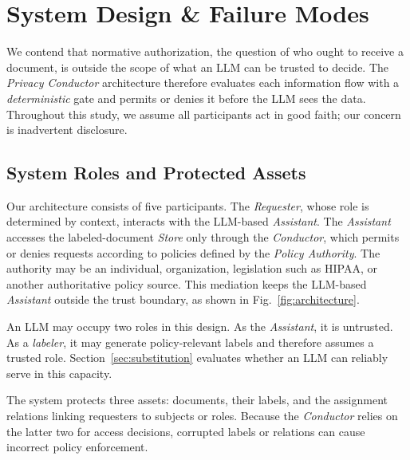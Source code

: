 \section{System Design \& Failure Modes}
\label{sec:design}

We contend that normative authorization, the question of who ought to receive
a document, is outside the scope of what an LLM can be trusted to decide. The \textit{Privacy Conductor} architecture therefore evaluates each information flow with a \textit{deterministic} gate and permits or denies it before the LLM sees the data. Throughout this study, we assume all participants act in good faith; our concern is inadvertent disclosure.

\subsection{System Roles and Protected Assets}
Our architecture consists of five participants. The \emph{Requester}, whose role is determined by context, interacts with the LLM-based \emph{Assistant}. The \emph{Assistant} accesses the labeled-document \emph{Store} only through the \emph{Conductor}, which permits or denies requests according to policies defined by the \emph{Policy Authority}. The authority may be an individual, organization, legislation such as HIPAA, or another authoritative policy source. This mediation keeps the LLM-based \emph{Assistant} outside the trust boundary, as shown in Fig.~\ref{fig:architecture}.

An LLM may occupy two roles in this design. As the \emph{Assistant}, it is untrusted. As a \emph{labeler}, it may generate policy-relevant labels and therefore assumes a trusted role. Section~\ref{sec:substitution} evaluates whether an LLM can reliably serve in this capacity.

The system protects three assets: documents, their labels, and the assignment relations linking requesters to subjects or roles. Because the \emph{Conductor} relies on the latter two for access decisions, corrupted labels or relations can cause incorrect policy enforcement.


